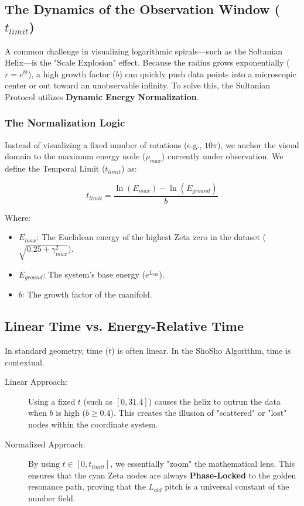 \documentclass[11pt,a4paper]{article}
\begin{document}
\subsection{The Dynamics of the Observation Window ($t_{limit}$)}
A common challenge in visualizing logarithmic spirals—such as the Soltanian Helix—is the "Scale Explosion" effect. Because the radius grows exponentially ($r = e^{bt}$), a high growth factor ($b$) can quickly push data points into a microscopic center or out toward an unobservable infinity. To solve this, the Sultanian Protocol utilizes \textbf{Dynamic Energy Normalization}.

\subsubsection{The Normalization Logic}
Instead of visualizing a fixed number of rotations (e.g., $10\pi$), we anchor the visual domain to the maximum energy node ($\rho_{max}$) currently under observation. We define the Temporal Limit ($t_{limit}$) as:

\begin{equation}
    t_{limit} = \frac{\ln(E_{max}) - \ln(E_{ground})}{b}
\end{equation}

\noindent Where:
\begin{itemize}
    \item $E_{max}$: The Euclidean energy of the highest Zeta zero in the dataset ($\sqrt{0.25 + \gamma_{max}^2}$).
    \item $E_{ground}$: The system's base energy ($e^{L_{old}}$).
    \item $b$: The growth factor of the manifold.
\end{itemize}

\subsection{Linear Time vs. Energy-Relative Time}
In standard geometry, time ($t$) is often linear. In the ShoSho Algorithm, time is contextual.

\begin{description}
    \item[Linear Approach:] Using a fixed $t$ (such as $[0, 31.4]$) causes the helix to outrun the data when $b$ is high ($b \ge 0.4$). This creates the illusion of "scattered" or "lost" nodes within the coordinate system.
    \item[Normalized Approach:] By using $t \in [0, t_{limit}]$, we essentially "zoom" the mathematical lens. This ensures that the cyan Zeta nodes are always \textbf{Phase-Locked} to the golden resonance path, proving that the $L_{old}$ pitch is a universal constant of the number field.
\end{description}
\end{document}

